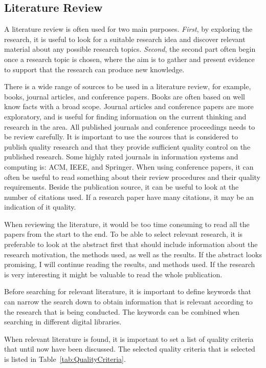     \subsection{Literature Review}\label{sec:methodliteraturereview}

    A literature review is often used for two main purposes. {\it First}, by exploring the research, it is useful to look for a suitable research idea and discover relevant material about any possible research topics. {\it Second}, the second part often begin once a research topic is chosen, where the aim is to gather and present evidence to support that the research  can produce new knowledge. 

    There is a wide range of sources to be used in a literature review, for example, books, journal articles, and conference papers. Books are often based on well know facts with a broad scope. Journal articles and conference papers are more exploratory, and is useful for finding information on the current thinking and research in the area. All published journals and conference proceedings needs to be review carefully. It is important to use the sources that is considered to publish quality research and that they provide sufficient quality control on the published research. Some highly rated journals in information systems and computing is: ACM, IEEE, and Springer. When using conference papers, it can often be useful to read something about their review procedures and their quality requirements. Beside the publication source, it can be useful to look at the number of citations used. If a research paper have many citations, it may be an indication of it quality. 

    When reviewing the literature, it would be too time consuming to read all the papers from the start to the end. To be able to select relevant research, it is preferable to look at the abstract first that should include information about the research motivation, the methods used, as well as the results. If the abstract looks promising, I will continue reading the results, and methods used. If the research is very interesting it might be valuable to read the whole publication. 

    Before searching for relevant literature, it is important to define keywords that can narrow the search down to obtain information that is relevant according to the research that is being conducted. The keywords can be combined when searching in different digital libraries. 

    When relevant literature is found, it is important to set a list of quality criteria that until now have been discussed. 
    The selected quality criteria that is selected is listed in Table~\ref{tab:QualityCriteria}.

